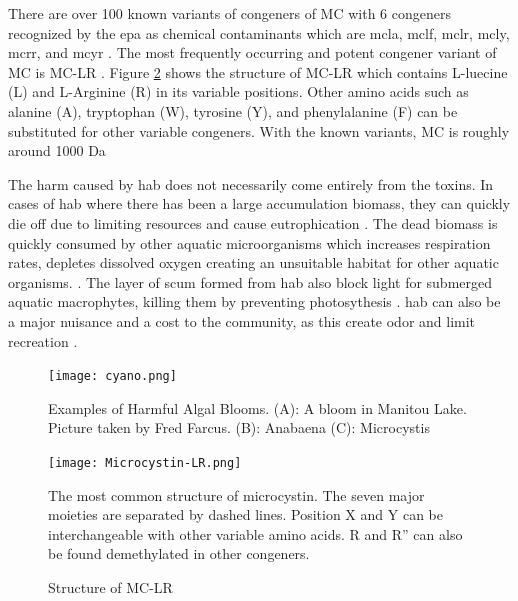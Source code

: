 There are over 100 known variants of congeners of MC with 6 congeners recognized by the \gls{epa} as chemical contaminants which are \gls{mcla}, \gls{mclf}, \gls{mclr}, \gls{mcly}, \gls{mcrr}, and \gls{mcyr} \cite{puddick_modulation_2016}. The most frequently occurring and potent congener variant of MC is MC-LR \cite{rastogi_cyanotoxin-microcystins:_2014}. Figure \ref{fig:structure1} shows the structure of MC-LR which contains L-luecine (L) and L-Arginine (R) in its variable positions. Other amino acids such as alanine (A), tryptophan (W), tyrosine (Y), and phenylalanine (F) can be substituted for other variable congeners. With the known variants, MC is roughly around 1000 Da \cite{dittmann_cyanobacterial_2012}

The harm caused by \gls{hab} does not necessarily come entirely from the toxins. In cases of \gls{hab} where there has been a large accumulation biomass, they can quickly die off due to limiting resources and cause eutrophication \cite{charlton_oxygen_1980}. The dead biomass is quickly consumed by other aquatic microorganisms which increases respiration rates, depletes dissolved oxygen creating an unsuitable habitat for other aquatic organisms.  \cite{anderson_harmful_2002}. The layer of scum formed from \gls{hab} also block light for submerged aquatic macrophytes, killing them by preventing photosythesis \cite{ bucak_modeling_2018}. \gls{hab} can also be a major nuisance and a cost to the community, as this create odor and limit recreation \cite{graham_cyanotoxin_2010, carmichael_health_2016}.


\begin{figure}[!h]
	\texttt{[image: cyano.png]}
	\caption{
		Examples of Harmful Algal Blooms. (A): A bloom in Manitou Lake. Picture taken by Fred Farcus. (B): Anabaena (C): Microcystis
	}
	\label{fig:cyano}
\end{figure}


\begin{figure}[!h]
   \texttt{[image: Microcystin-LR.png]}
   \caption{Structure of MC-LR}
   \label{fig:structure1}
   \begin{flushleft}
   The most common structure of microcystin. The seven major moieties are separated by dashed lines. Position X and Y can be interchangeable with other variable amino acids. R and R'' can also be found demethylated in other congeners. 
     \end{flushleft}
 \end{figure}


